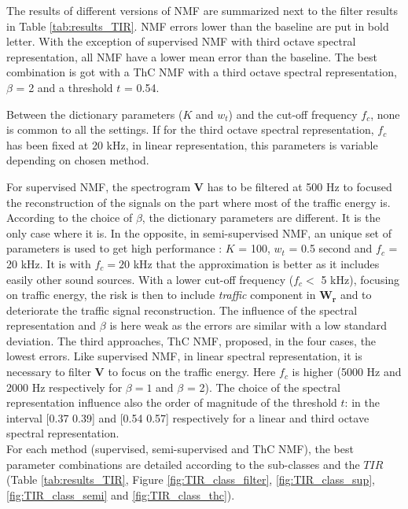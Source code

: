 \documentclass[twocolumn,a4paper,10pt]{article}
\begin{document}
The results of different versions of NMF are summarized next to the filter results in Table \ref{tab:results_TIR}. NMF errors lower than the baseline are put in bold letter. With the exception of supervised NMF with third octave spectral representation, all NMF have a lower mean error than the baseline. The best combination is got with a ThC NMF with a third octave spectral representation, $\beta$ = 2 and a threshold $t$ = 0.54. 

Between the dictionary parameters ($K$ and $w_t$) and the cut-off frequency $f_c$, none is common to all the settings. If for the third octave spectral representation, $f_c$ has been fixed at 20 kHz, in linear representation, this parameters is variable depending on chosen method. 

For supervised NMF, the spectrogram $\mathbf{V}$ has to be filtered at 500 Hz to focused the reconstruction of the signals on the part where most of the traffic energy is. According to the choice of $\beta$, the dictionary parameters are different. It is the only case where it is. 
In the opposite, in semi-supervised NMF, an unique set of parameters is used to get high performance : $K$ = 100, $w_t$ = 0.5 second and $f_c$ = 20 kHz. It is with $f_c = 20$ kHz that the approximation is better as it includes easily other sound sources. With a lower cut-off frequency ($ f_c <$ 5 kHz), focusing on traffic energy, the risk is then to include \textit{traffic} component in $\mathbf{W_r}$ and to deteriorate the traffic signal reconstruction. The influence of the spectral representation and $\beta$ is here weak as the errors are similar with a low standard deviation. The third approaches, ThC NMF, proposed, in the four cases, the lowest errors. Like supervised NMF, in linear spectral representation, it is necessary to filter $\mathbf{V}$ to focus on the traffic energy. Here $f_c$ is higher (5000 Hz and 2000 Hz respectively for $\beta = 1$ and $\beta$ = 2). The choice of the spectral representation influence also the order of magnitude of the threshold $t$: in the interval [0.37 0.39] and [0.54 0.57] respectively for a linear and third octave spectral representation.\\


For each method (supervised, semi-supervised and ThC NMF), the best parameter combinations are detailed according to the sub-classes and the $TIR$ (Table \ref{tab:results_TIR},  Figure \ref{fig:TIR_class_filter}, \ref{fig:TIR_class_sup}, \ref{fig:TIR_class_semi} and \ref{fig:TIR_class_thc}). \\
\end{document}
